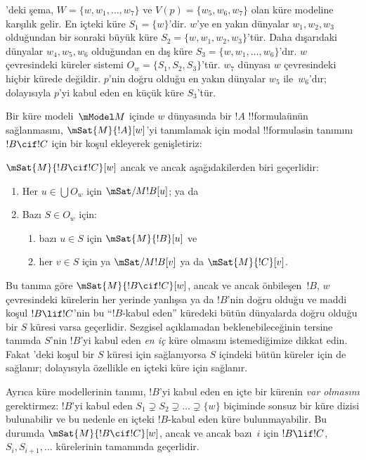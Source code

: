'deki şema, $W=\{w,w_1,\dots,w_7\}$ ve
$V(p)=\{w_5,w_6,w_7\}$ olan küre modeline karşılık gelir. En içteki küre
$S_1=\{w\}$'dir. $w$'ye en yakın dünyalar $w_1,w_2,w_3$ olduğundan bir
sonraki büyük küre $S_2=\{w,w_1,w_2,w_3\}$'tür. Daha dışarıdaki dünyalar
$w_4,w_5,w_6$ olduğundan en dış küre $S_3=\{w,w_1,\dots,w_6\}$'dır.
$w$ çevresindeki küreler sistemi $O_w=\{S_1,S_2,S_3\}$'tür. $w_7$ dünyası
$w$ çevresindeki hiçbir kürede değildir. $p$'nin doğru olduğu en yakın
dünyalar $w_5$ ile~$w_6$'dır; dolayısıyla $p$'yi kabul eden en küçük küre
$S_3$'tür.

Bir küre modeli~$\mModel M$ içinde $w$ dünyasında bir $!A$ !!{formula}{}ünün
sağlanmasını, $\mSat{M}{!A}[w]$'yi tanımlamak için modal !!{formula}s{}in
tanımını $!B\cif !C$ için bir koşul ekleyerek genişletiriz:

\begin{defn}
  $\mSat{M}{!B \cif !C}[w]$ ancak ve ancak aşağıdakilerden biri geçerlidir:
  \begin{enumerate}
  \item{} Her $u\in\bigcup O_w$ için
    $\mSat/{M}{!B}[u]$; ya da
  \item{} Bazı $S\in O_w$ için:
    \begin{enumerate}
      \item bazı $u\in S$ için $\mSat{M}{!B}[u]$ ve
      \item her $v\in S$ için ya $\mSat/{M}{!B}[v]$ ya da
        $\mSat{M}{!C}[v]$.
    \end{enumerate}
  \end{enumerate}
\end{defn}

Bu tanıma göre $\mSat{M}{!B\cif !C}[w]$, ancak ve ancak önbileşen~$!B$,
$w$ çevresindeki kürelerin her yerinde yanlışsa ya da $!B$'nin doğru olduğu
ve maddi koşul $!B\lif !C$'nin bu ``$!B$-kabul eden'' küredeki bütün
dünyalarda doğru olduğu bir $S$ küresi varsa geçerlidir. Sezgisel açıklamadan
beklenebileceğinin tersine tanımda $S$'nin $!B$'yi kabul eden \emph{en iç}
küre olmasını istemediğimize dikkat edin. Fakat
'deki koşul bir $S$ küresi için sağlanıyorsa $S$
içindeki bütün küreler için de sağlanır; dolayısıyla özellikle en içteki küre
için sağlanır.

Ayrıca küre modellerinin tanımı, $!B$'yi kabul eden en içte bir kürenin
\emph{var olmasını} gerektirmez: $!B$'yi kabul eden
$S_1\supsetneq S_2\supsetneq\dots\supsetneq\{w\}$ biçiminde sonsuz bir
küre dizisi bulunabilir ve bu nedenle en içteki $!B$-kabul eden küre
bulunmayabilir. Bu durumda $\mSat{M}{!B\cif !C}[w]$, ancak ve ancak bazı~$i$
için $!B\lif !C$, $S_i,S_{i+1},\dots$ kürelerinin tamamında geçerlidir.

